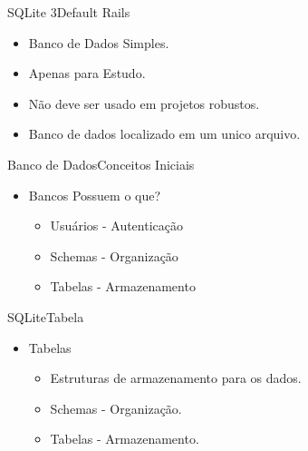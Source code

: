\documentclass{beamer}
\begin{document}
\begin{frame}[fragile]{SQLite 3}{Default Rails}
	\begin{itemize}  \itemsep 2em
		\item{ \LARGE Banco de Dados Simples.}
		\item{ \LARGE Apenas para Estudo.}
		\item{ \LARGE Não deve ser usado em projetos robustos.}
		\item{ \LARGE Banco de dados localizado em um unico arquivo.}
								
	\end{itemize}
\end{frame}


\begin{frame}{Banco de Dados}{Conceitos Iniciais}
	\begin{itemize} 
		\item{
			\LARGE Bancos Possuem o que?
			\begin{itemize} \itemsep 2em
				\item{ \Large Usuários - Autenticação}
				\item{ \Large Schemas - Organização}
				\item{ \Large Tabelas - Armazenamento}
			\end{itemize}
		}
	\end{itemize}
\end{frame}

\begin{frame}{SQLite}{Tabela}
	\begin{itemize} 
		\item{
			\LARGE Tabelas
			\begin{itemize} \itemsep 2em
				\item{ \Large Estruturas de armazenamento para os dados.}
				\item{ \Large Schemas - Organização.}
				\item{ \Large Tabelas - Armazenamento.}
			\end{itemize}
		}
	\end{itemize}
\end{frame}
\end{document}
